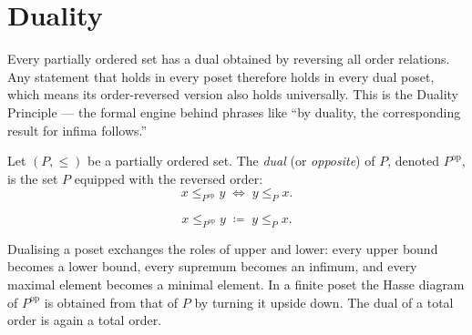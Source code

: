 
\section{Duality}
\label{sec:duality}

\begin{tcolorbox}[
  colback=gray!6,
  colframe=gray!40,
  arc=2pt,
  left=8pt, right=8pt, top=6pt, bottom=6pt,
  title={\small\textbf{Toolkit: Duality}},
  fonttitle=\small\bfseries
]
Every partially ordered set has a dual obtained by reversing all order
relations.  Any statement that holds in every poset therefore holds in
every dual poset, which means its order-reversed version also holds
universally.  This is the Duality Principle — the formal engine behind
phrases like ``by duality, the corresponding result for infima follows.''
\end{tcolorbox}


\begin{tcolorbox}[colback=defbox, colframe=defborder, arc=2pt,
  left=6pt, right=6pt, top=4pt, bottom=4pt,
  title={\small\textbf{Definition (Dual Ordered Set)}},
  fonttitle=\small\bfseries]
\begin{definition}
\label{def:dual-ordered-set}
Let $(P, \leq)$ be a partially ordered set.  The \emph{dual} (or
\emph{opposite}) of $P$, denoted $P^{\mathrm{op}}$, is the set $P$
equipped with the reversed order:
\[
x \leq_{P^{\mathrm{op}}} y \;\Longleftrightarrow\; y \leq_P x.
\]
\end{definition}
\end{tcolorbox}

\begin{remark*}
\[
x \leq_{P^{\mathrm{op}}} y
\;\coloneqq\;
y \leq_P x.
\]
\end{remark*}

\begin{remark*}[Interpretation]
Dualising a poset exchanges the roles of upper and lower: every upper bound
becomes a lower bound, every supremum becomes an infimum, and every maximal
element becomes a minimal element.  In a finite poset the Hasse diagram of
$P^{\mathrm{op}}$ is obtained from that of $P$ by turning it upside down.
The dual of a total order is again a total order.
\end{remark*}

